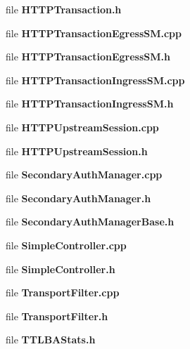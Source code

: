 \begin{DoxyCompactItemize}
file {\bf H\+T\+T\+P\+Transaction.\+h}
\item 
file {\bf H\+T\+T\+P\+Transaction\+Egress\+S\+M.\+cpp}
\item 
file {\bf H\+T\+T\+P\+Transaction\+Egress\+S\+M.\+h}
\item 
file {\bf H\+T\+T\+P\+Transaction\+Ingress\+S\+M.\+cpp}
\item 
file {\bf H\+T\+T\+P\+Transaction\+Ingress\+S\+M.\+h}
\item 
file {\bf H\+T\+T\+P\+Upstream\+Session.\+cpp}
\item 
file {\bf H\+T\+T\+P\+Upstream\+Session.\+h}
\item 
file {\bf Secondary\+Auth\+Manager.\+cpp}
\item 
file {\bf Secondary\+Auth\+Manager.\+h}
\item 
file {\bf Secondary\+Auth\+Manager\+Base.\+h}
\item 
file {\bf Simple\+Controller.\+cpp}
\item 
file {\bf Simple\+Controller.\+h}
\item 
file {\bf Transport\+Filter.\+cpp}
\item 
file {\bf Transport\+Filter.\+h}
\item 
file {\bf T\+T\+L\+B\+A\+Stats.\+h}
\end{DoxyCompactItemize}
